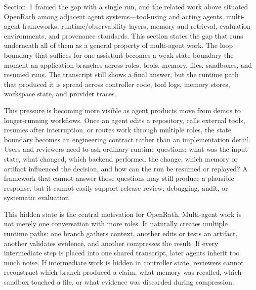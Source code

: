 
Section~1 framed the gap with a single run, and the related work above situated
OpenRath among adjacent agent systems---tool-using and acting agents, multi-agent
frameworks, runtime/observability layers, memory and retrieval, evaluation
environments, and provenance standards. This section states the gap that runs
underneath all of them as a general property of multi-agent work. The loop
boundary that suffices for one assistant becomes a weak state boundary the moment
an application branches across roles, tools, memory, files, sandboxes, and
resumed runs. The transcript still shows a final answer, but the runtime path
that produced it is spread across controller code, tool logs, memory stores,
workspace state, and provider traces.

This pressure is becoming more visible as agent products move from demos to
longer-running workflows. Once an agent edits a repository, calls external
tools, resumes after interruption, or routes work through multiple roles, the
state boundary becomes an engineering contract rather than an implementation
detail. Users and reviewers need to ask ordinary runtime questions: what was
the input state, what changed, which backend performed the change, which memory
or artifact influenced the decision, and how can the run be resumed or
replayed? A framework that cannot answer those questions may still produce a
plausible response, but it cannot easily support release review, debugging,
audit, or systematic evaluation.

This hidden state is the central motivation for OpenRath. Multi-agent work is
not merely one conversation with more roles. It naturally creates multiple
runtime paths: one branch gathers context, another edits or tests an artifact,
another validates evidence, and another compresses the result. If every
intermediate step is placed into one shared transcript, later agents inherit too
much noise. If intermediate work is hidden in controller state, reviewers cannot
reconstruct which branch produced a claim, what memory was recalled, which
sandbox touched a file, or what evidence was discarded during compression.

